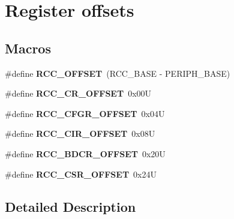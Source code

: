 \hypertarget{group___r_c_c___register___offset}{}\section{Register offsets}
\label{group___r_c_c___register___offset}
\subsection*{Macros}
\begin{DoxyCompactItemize}
\item 
\mbox{\label{group___r_c_c___register___offset_ga539e07c3b3c55f1f1d47231341fb11e1}} 
\#define {\bfseries R\+C\+C\+\_\+\+O\+F\+F\+S\+ET}~(R\+C\+C\+\_\+\+B\+A\+SE -\/ P\+E\+R\+I\+P\+H\+\_\+\+B\+A\+SE)
\item 
\mbox{\label{group___r_c_c___register___offset_ga6df8d81c05c07cb0c26bbf27ea7fe55c}} 
\#define {\bfseries R\+C\+C\+\_\+\+C\+R\+\_\+\+O\+F\+F\+S\+ET}~0x00U
\item 
\mbox{\label{group___r_c_c___register___offset_gafb1e90a88869585b970749de3c16ce4a}} 
\#define {\bfseries R\+C\+C\+\_\+\+C\+F\+G\+R\+\_\+\+O\+F\+F\+S\+ET}~0x04U
\item 
\mbox{\label{group___r_c_c___register___offset_gace77000e86938c6253dc08e8c17e891a}} 
\#define {\bfseries R\+C\+C\+\_\+\+C\+I\+R\+\_\+\+O\+F\+F\+S\+ET}~0x08U
\item 
\mbox{\label{group___r_c_c___register___offset_gaf234fe5d9628a3f0769721e76f83c566}} 
\#define {\bfseries R\+C\+C\+\_\+\+B\+D\+C\+R\+\_\+\+O\+F\+F\+S\+ET}~0x20U
\item 
\mbox{\label{group___r_c_c___register___offset_ga63141585a221eed1fd009eb80e406619}} 
\#define {\bfseries R\+C\+C\+\_\+\+C\+S\+R\+\_\+\+O\+F\+F\+S\+ET}~0x24U
\end{DoxyCompactItemize}


\subsection{Detailed Description}
